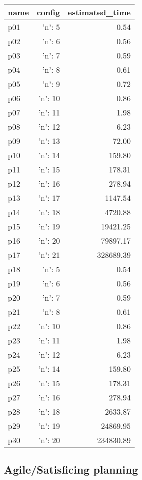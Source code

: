 \documentclass{article}
\begin{document}
                            \begin{center}
                            \scriptsize
                            \begin{tabular}{@{}l|r|r@{}}
                            name & config & estimated\_time\\\midrule
                              p01&{'n': 5}&0.54\\
  p02&{'n': 6}&0.56\\
  p03&{'n': 7}&0.59\\
  p04&{'n': 8}&0.61\\
  p05&{'n': 9}&0.72\\
  p06&{'n': 10}&0.86\\
  p07&{'n': 11}&1.98\\
  p08&{'n': 12}&6.23\\
  p09&{'n': 13}&72.00\\
  p10&{'n': 14}&159.80\\
  p11&{'n': 15}&178.31\\
  p12&{'n': 16}&278.94\\
  p13&{'n': 17}&1147.54\\
  p14&{'n': 18}&4720.88\\
  p15&{'n': 19}&19421.25\\
  p16&{'n': 20}&79897.17\\
  p17&{'n': 21}&328689.39\\
  p18&{'n': 5}&0.54\\
  p19&{'n': 6}&0.56\\
  p20&{'n': 7}&0.59\\
  p21&{'n': 8}&0.61\\
  p22&{'n': 10}&0.86\\
  p23&{'n': 11}&1.98\\
  p24&{'n': 12}&6.23\\
  p25&{'n': 14}&159.80\\
  p26&{'n': 15}&178.31\\
  p27&{'n': 16}&278.94\\
  p28&{'n': 18}&2633.87\\
  p29&{'n': 19}&24869.95\\
  p30&{'n': 20}&234830.89
                            \end{tabular}
                            \end{center}
                    

                                \subsection*{Agile/Satisficing planning}
                                
\end{document}
